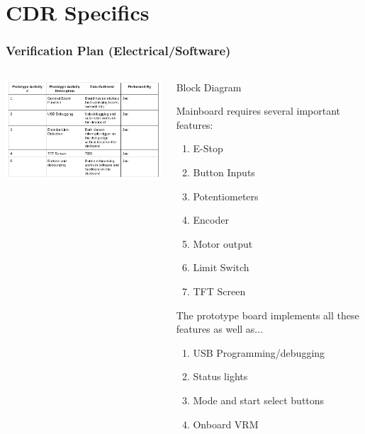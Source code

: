 \documentclass[aspectratio=169]{beamer}
\begin{document}
\section{CDR Specifics}
\begin{frame}
    \frametitle{Verification Plan (Electrical/Software)}

    \begin{columns}
        \begin{column}{0.58\textwidth}
            \includegraphics[width=8.5cm]{ElectricalPrototype}
        \end{column}

        \begin{column}{0.40\textwidth}
            \begin{block}{Block Diagram}
                \tiny{
                    Mainboard requires several important features:
                    \begin{enumerate}
                        \item E-Stop
                        \item Button Inputs
                        \item Potentiometers
                        \item Encoder
                        \item Motor output
                        \item Limit Switch
                        \item TFT Screen
                    \end{enumerate}

                    The prototype board implements all these features as well as...
                    \begin{enumerate}
                        \item USB Programming/debugging
                        \item Status lights
                        \item Mode and start select buttons
                        \item Onboard VRM
                    \end{enumerate}
                }
            \end{block}
        \end{column}
    \end{columns}


\end{frame}
\end{document}
